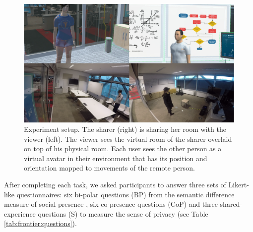 \begin{figure}
    \begin{center}
    \includegraphics[width=.8\linewidth]{images/54-hiding-frontier18/synced.png}
    \caption{Experiment setup. The sharer (right) is sharing her room with the viewer (left). The viewer sees the virtual room of the sharer overlaid on top of his physical room. Each user sees the other person as a virtual avatar in their environment that has its position and orientation mapped to movements of the remote person.}
    \label{fig:frontier18:setup}
    \end{center}
\end{figure}

After completing each task, we asked participants to answer three sets of Likert-like questionnaires: six bi-polar questions (BP) from the semantic difference measure of social presence \cite{Smith2018}, six co-presence questions (CoP) and three shared-experience questions (S) to measure the sense of privacy (see Table \ref{tab:frontier:questions}).  

